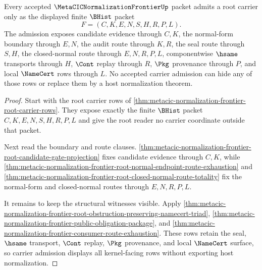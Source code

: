 \begin{theorem}
\label{thm:metacic-normalization-frontier-carrier-admission}
Every accepted $\MetaCICNormalizationFrontierUp$ packet admits a root carrier only as the displayed finite $\BHist$ packet
$$
F=(C,K,E,N,S,H,R,P,L).
$$
The admission exposes candidate evidence through $C,K$, the normal-form boundary through $E,N$, the audit route through $K,R$, the seal route through $S,H$, the closed-normal route through $E,N,R,P,L$, componentwise $\hsame$ transports through $H$, $\Cont$ replay through $R$, $\Pkg$ provenance through $P$, and local $\NameCert$ rows through $L$. No accepted carrier admission can hide any of those rows or replace them by a host normalization theorem.
\end{theorem}
\begin{proof}
Start with the root carrier rows of \autoref{thm:metacic-normalization-frontier-root-carrier-rows}. They expose exactly the finite $\BHist$ packet $C,K,E,N,S,H,R,P,L$ and give the root reader no carrier coordinate outside that packet.

Next read the boundary and route clauses. \autoref{thm:metacic-normalization-frontier-root-candidate-gate-projection} fixes candidate evidence through $C,K$, while \autoref{thm:metacic-normalization-frontier-root-normal-endpoint-route-exhaustion} and \autoref{thm:metacic-normalization-frontier-root-closed-normal-route-totality} fix the normal-form and closed-normal routes through $E,N,R,P,L$.

It remains to keep the structural witnesses visible. Apply \autoref{thm:metacic-normalization-frontier-root-obstruction-preserving-namecert-triad}, \autoref{thm:metacic-normalization-frontier-public-obligation-package}, and \autoref{thm:metacic-normalization-frontier-consumer-route-exhaustion}. These rows retain the seal, $\hsame$ transport, $\Cont$ replay, $\Pkg$ provenance, and local $\NameCert$ surface, so carrier admission displays all kernel-facing rows without exporting host normalization.
\end{proof}


